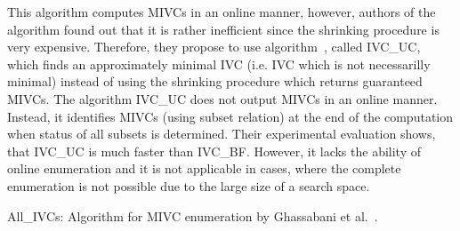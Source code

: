 %

This algorithm computes MIVCs in an online manner, however, authors of the algorithm found out that it is rather inefficient since the  shrinking procedure is very expensive. Therefore, they propose to use  algorithm~\cite{single-ivc}, called IVC\_UC, which finds an approximately minimal IVC (i.e. IVC which is not necessarilly minimal)  instead of using the shrinking procedure which returns guaranteed MIVCs. The algorithm IVC\_UC does not output MIVCs in an online manner. Instead, it identifies MIVCs (using subset relation) at the end of the computation when status of all subsets is determined. Their experimental evaluation shows, that IVC\_UC is much faster than IVC\_BF. However, it lacks the ability of online enumeration and it is not applicable in cases, where the complete enumeration is not possible due to the large size of a search space. 



\begin{algorithm}[!t]
\label{alg:all_ivcs}

\caption{All\_IVCs: Algorithm for MIVC enumeration by Ghassabani et al.~\cite{all-ivcs}. }
\end{algorithm}


